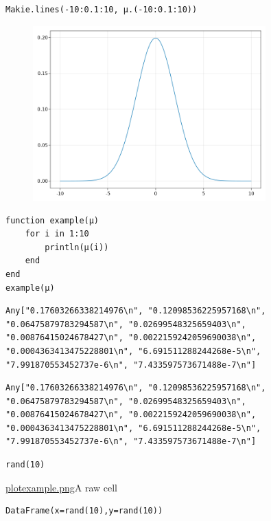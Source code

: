 \begin{lstlisting}[language=JuliaLocal, style=julia]
Makie.lines(-10:0.1:10, μ.(-10:0.1:10))
\end{lstlisting}

\begin{figure}[H]
	\centering
	\includegraphics[width=0.8\textwidth]{./figures/jupyternotebook_figure2.png}
	\label{fig:jupyternotebook_figure2.png}

\end{figure}

\begin{lstlisting}[language=JuliaLocal, style=julia]
function example(μ)
    for i in 1:10
        println(μ(i))
    end
end
example(μ)
\end{lstlisting}

\begin{verbatim}
Any["0.17603266338214976\n", "0.12098536225957168\n", "0.06475879783294587\n", "0.02699548325659403\n", "0.00876415024678427\n", "0.0022159242059690038\n", "0.0004363413475228801\n", "6.691511288244268e-5\n", "7.991870553452737e-6\n", "7.433597573671488e-7\n"]
\end{verbatim}

\begin{verbatim}
Any["0.17603266338214976\n", "0.12098536225957168\n", "0.06475879783294587\n", "0.02699548325659403\n", "0.00876415024678427\n", "0.0022159242059690038\n", "0.0004363413475228801\n", "6.691511288244268e-5\n", "7.991870553452737e-6\n", "7.433597573671488e-7\n"]
\end{verbatim}

\begin{lstlisting}[language=JuliaLocal, style=julia]
rand(10)
\end{lstlisting}
\href{Figure2}{plotexample.png}A raw cell
\begin{lstlisting}[language=JuliaLocal, style=julia]
DataFrame(x=rand(10),y=rand(10))
\end{lstlisting}

